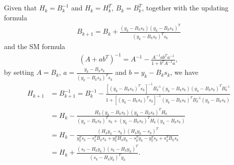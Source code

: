 \documentclass[11pt]{article}
\begin{document}
\section{}
Given that $H_k = B_k^{-1}$ and $H_k = H_k^T$, $B_k = B_k^T$, together with the updating formula
\begin{equation}\begin{split} 
B_{k+1} = B_k + \frac{(y_k-B_ks_k)(y_k-B_ks_k)^T}{(y_k-B_ks_k)^Ts_k}
\end{split}\nonumber\end{equation} 
and the SM formula
\begin{equation}\begin{split} 
(A+ab^T)^{-1} = A^{-1} - \frac{A^{-1}ab^Ta^{-1}}{1+b^TA^{-1}a},
\end{split}\nonumber\end{equation}
by setting $A=B_k$, $a=\frac{y_k-B_ks_k}{(y_k-B_ks_k)^Ts_k}$ and $b=y_k-B_ks_k$, we have
\begin{equation}\begin{split}
H_{k+1}&=B_{k+1}^{-1} = B_k^{-1}-\frac{[(y_k-B_ks_k)^Ts_k]^{-1}B_k^{-1}(y_k-B_ks_k)(y_k-B_ks_k)^TB_k^{-1}}{1+[(y_k-B_ks_k)^Ts_k]^{-1}(y_k-B_ks_k)^TB_k^{-1}(y_k-B_ks_k)}\\
&=H_k-\frac{H_k(y_k-B_ks_k)(y_k-B_ks_k)^TH_k}{(y_k-B_ks_k)^Ts_k+(y_k-B_ks_k)^TH_k(y_k-B_ks_k)} \\
&=H_k-\frac{(H_ky_k-s_k)(H_ky_k-s_k)^T}{y_k^Ts_k-s_k^TB_ks_k+y_k^TH_ky_k-s_k^Ty_k-y_k^Ts_k+s_k^TB_ks_k} \\
&=H_k+\frac{(s_k-H_ky_k)(s_k-H_ky_k)^T}{(s_k-H_ky_k)^Ty_k}.
\end{split}\nonumber\end{equation} 
\end{document}
